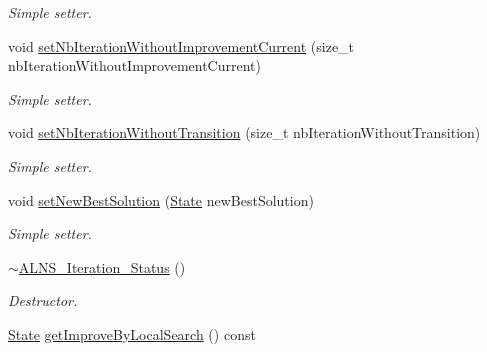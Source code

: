\begin{DoxyCompactItemize}
\begin{DoxyCompactList}\small\item\em Simple setter. \end{DoxyCompactList}\item 
\hypertarget{classALNS__Iteration__Status_a23d0db24e275cdc792b624b792020491}{void \hyperlink{classALNS__Iteration__Status_a23d0db24e275cdc792b624b792020491}{set\-Nb\-Iteration\-Without\-Improvement\-Current} (size\-\_\-t nb\-Iteration\-Without\-Improvement\-Current)}\label{classALNS__Iteration__Status_a23d0db24e275cdc792b624b792020491}

\begin{DoxyCompactList}\small\item\em Simple setter. \end{DoxyCompactList}\item 
\hypertarget{classALNS__Iteration__Status_ada17bcf0bfcb2f4dfb1fb3a5495e9dd1}{void \hyperlink{classALNS__Iteration__Status_ada17bcf0bfcb2f4dfb1fb3a5495e9dd1}{set\-Nb\-Iteration\-Without\-Transition} (size\-\_\-t nb\-Iteration\-Without\-Transition)}\label{classALNS__Iteration__Status_ada17bcf0bfcb2f4dfb1fb3a5495e9dd1}

\begin{DoxyCompactList}\small\item\em Simple setter. \end{DoxyCompactList}\item 
\hypertarget{classALNS__Iteration__Status_a84c1ffabe1926283b5c74387e1b4c956}{void \hyperlink{classALNS__Iteration__Status_a84c1ffabe1926283b5c74387e1b4c956}{set\-New\-Best\-Solution} (\hyperlink{classALNS__Iteration__Status_a6d748b05080edeab9e82ac32c9904133}{State} new\-Best\-Solution)}\label{classALNS__Iteration__Status_a84c1ffabe1926283b5c74387e1b4c956}

\begin{DoxyCompactList}\small\item\em Simple setter. \end{DoxyCompactList}\item 
\hypertarget{classALNS__Iteration__Status_a0c1f750deed2f1e4291aff01025f5f79}{\hyperlink{classALNS__Iteration__Status_a0c1f750deed2f1e4291aff01025f5f79}{$\sim$\-A\-L\-N\-S\-\_\-\-Iteration\-\_\-\-Status} ()}\label{classALNS__Iteration__Status_a0c1f750deed2f1e4291aff01025f5f79}

\begin{DoxyCompactList}\small\item\em Destructor. \end{DoxyCompactList}\item 
\hypertarget{classALNS__Iteration__Status_aeaece7fc0a46c4e7052dc27cb29e82dc}{\hyperlink{classALNS__Iteration__Status_a6d748b05080edeab9e82ac32c9904133}{State} \hyperlink{classALNS__Iteration__Status_aeaece7fc0a46c4e7052dc27cb29e82dc}{get\-Improve\-By\-Local\-Search} () const }\label{classALNS__Iteration__Status_aeaece7fc0a46c4e7052dc27cb29e82dc}


\end{DoxyCompactItemize}
